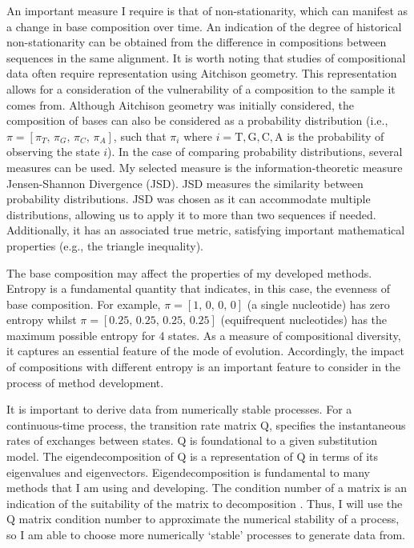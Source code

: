 An important measure I require is that of non-stationarity, which can manifest as a change in base composition over time. An indication of the degree of historical non-stationarity can be obtained from the difference in compositions between sequences in the same alignment. It is worth noting that studies of compositional data often require representation using Aitchison geometry. This representation allows for a consideration of the vulnerability of a composition to the sample it comes from. Although Aitchison geometry was initially considered, the composition of bases can also be considered as a probability distribution (i.e., $\pi = [\pi_T,\, \pi_G, \, \pi_C, \, \pi_A]$, such that $\pi_i$ where $i= \mathrm{T}, \mathrm{G}, \mathrm{C}, \mathrm{A}$ is the probability of observing the state $i$). In the case of comparing probability distributions, several measures can be used. My selected measure is the information-theoretic measure Jensen-Shannon Divergence (JSD). JSD measures the similarity between probability distributions. JSD was chosen as it can accommodate multiple distributions, allowing us to apply it to more than two sequences if needed. Additionally, it has an associated true metric, satisfying important mathematical properties (e.g., the triangle inequality). 

The base composition may affect the properties of my developed methods. Entropy is a fundamental quantity that indicates, in this case, the evenness of base composition. For example, $\pi =[1,\, 0,\, 0,\, 0]$  (a single nucleotide) has zero entropy whilst  $\pi =[0.25,\, 0.25,\, 0.25,\, 0.25]$ (equifrequent nucleotides) has the maximum possible entropy for 4 states. As a measure of compositional diversity, it captures an essential feature of the mode of evolution. Accordingly, the impact of compositions with different entropy is an important feature to consider in the process of method development.

 It is important to derive data from numerically stable processes. For a continuous-time process, the transition rate matrix $\mathrm{Q}$, specifies the instantaneous rates of exchanges between states. $\mathrm{Q}$ is foundational to a given substitution model. The eigendecomposition of $\mathrm{Q}$ is a representation of $\mathrm{Q}$ in terms of its eigenvalues and eigenvectors. Eigendecomposition is fundamental to many methods that I am using and developing. The condition number of a matrix is an indication of the suitability of the matrix to decomposition \citep{Schranz2008PathologicalPathogens}. Thus, I will use the $\mathrm{Q}$ matrix condition number to approximate the numerical stability of a process, so I am able to choose more numerically `stable' processes to generate data from.

